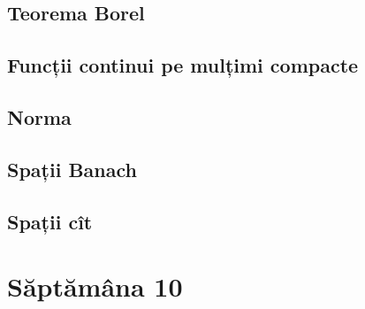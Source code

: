 \documentclass[a4paper,12pt]{article}
\theoremstyle{change}
\begin{document}
\subsection{Teorema Borel}

\subsection{Funcții continui pe mulțimi compacte}


\subsection{Norma}


\subsection{Spații Banach}

\subsection{Spații cît}

\section{Săptămâna 10}

\end{document}
